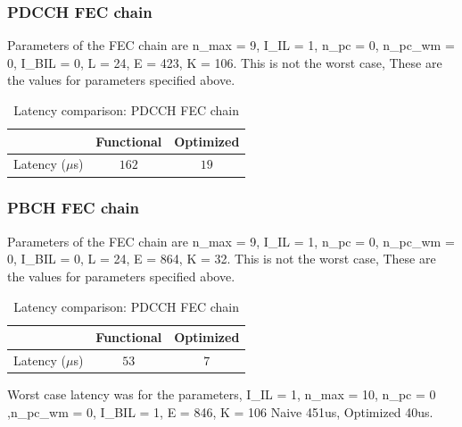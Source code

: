 \subsubsection{PDCCH FEC chain}
Parameters of the FEC chain are n\_max = 9, I\_IL = 1, n\_pc = 0, n\_pc\_wm = 0, I\_BIL = 0, L = 24, E = 423, K = 106.
This is not the worst case, These are the values for parameters specified above.
\begin{table}[!h]
	\begin{center}
		\caption{Latency comparison: PDCCH FEC chain}
		\label{tab:pdcchFecChain}
		\begin{tabular}{c|c|c} %
			\textbf{ } & Functional & Optimized \\
			\hline
			Latency ($\mu$s) & $162$ & $19$\\
		\end{tabular}
	\end{center}
\end{table}


\subsubsection{PBCH FEC chain}
Parameters of the FEC chain are n\_max = 9, I\_IL = 1, n\_pc = 0, n\_pc\_wm = 0, I\_BIL = 0, L = 24, E = 864, K = 32.
This is not the worst case, These are the values for parameters specified above.
\begin{table}[!h]
	\begin{center}
		\caption{Latency comparison: PDCCH FEC chain}
		\label{tab:pbchFecChain}
		\begin{tabular}{c|c|c} %
			\textbf{ } & Functional & Optimized \\
			\hline
			Latency ($\mu$s) & $53$ & $7$\\
		\end{tabular}
	\end{center}
\end{table}



Worst case latency was for the parameters, 
I\_IL = 1, n\_max = 10, n\_pc = 0 ,n\_pc\_wm = 0, I\_BIL = 1, E = 846, K = 106
Naive 451us, Optimized 40us.



